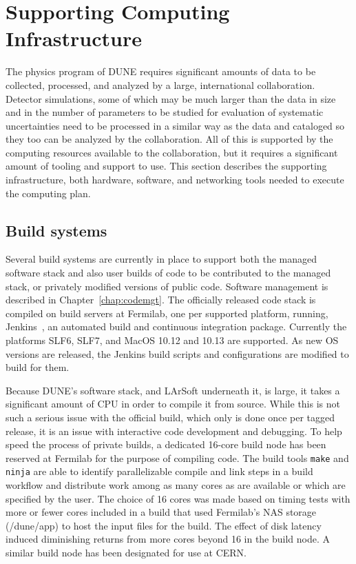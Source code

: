 %
\chapter{Supporting Computing Infrastructure} 

The physics program of DUNE requires significant amounts of data to be collected, processed,
and analyzed by a large, international collaboration.  Detector simulations, some of which may
be much larger than the data in size and in the number of parameters to be studied for evaluation
of systematic uncertainties need to be processed in a similar way as the data and cataloged so they
too can be analyzed by the collaboration.  All of this is supported by the computing resources
available to the collaboration, but it requires a significant amount of tooling and support to
use.  This section describes the supporting infrastructure, both hardware, software, and networking
tools needed to execute the computing plan.

\section{Build systems}

Several build systems are currently in place to support both the managed software stack and also user builds
of code to be contributed to the managed stack, or privately modified versions of public code.  Software management
is described in Chapter~\ref{chap:codemgt}.  The officially released code stack is compiled on build servers at Fermilab,
one per supported platform, running, Jenkins~\cite{jenkins}, an automated build and continuous integration
package.  Currently the platforms SLF6, SLF7, and MacOS 10.12 and 10.13 are supported.  As new OS versions are
released, the Jenkins build scripts and configurations are modified to build for them.

Because DUNE's software stack, and LArSoft underneath it, is large, it takes a significant amount of CPU in
order to compile it from source.  While this is not such a serious issue with the official build, which only
is done once per tagged release, it is an issue with interactive code development and debugging.  To help speed
the process of private builds, a dedicated 16-core build node has been reserved at Fermilab for the purpose of
compiling code.  The build tools {\tt{make}} and {\tt{ninja}} are able to identify parallelizable compile and link
steps in a build workflow and distribute work among as many cores as are available or which are specified by the
user.  The choice of 16 cores was made based on timing tests with more or fewer cores included in a build that
used Fermilab's NAS storage (/dune/app) to host the input files for the build.  The effect of disk latency induced
diminishing returns from more cores beyond 16 in the build node.  A similar build node has been designated for use
at CERN.

